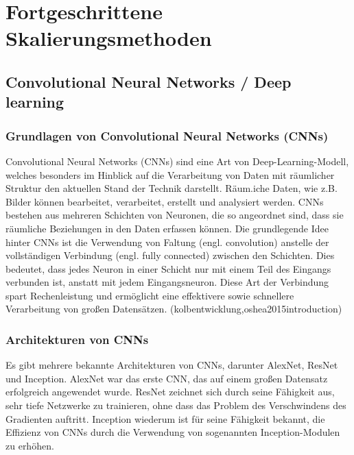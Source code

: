 


\chapter{Fortgeschrittene Skalierungsmethoden}
\section{Convolutional Neural Networks / Deep learning}
    \subsection{Grundlagen von Convolutional Neural Networks (CNNs)}
        Convolutional Neural Networks (CNNs) sind eine Art von Deep-Learning-Modell, welches besonders im Hinblick auf die Verarbeitung von Daten mit räumlicher Struktur den aktuellen Stand der Technik darstellt. 
        Räum.iche Daten, wie z.B. Bilder können bearbeitet, verarbeitet, erstellt und analysiert werden. 
        CNNs bestehen aus mehreren Schichten von Neuronen, die so angeordnet sind, dass sie räumliche Beziehungen in den Daten erfassen können.
        Die grundlegende Idee hinter CNNs ist die Verwendung von Faltung (engl. convolution) anstelle der vollständigen Verbindung (engl. fully connected) zwischen den Schichten. 
        Dies bedeutet, dass jedes Neuron in einer Schicht nur mit einem Teil des Eingangs verbunden ist, anstatt mit jedem Eingangsneuron. 
        Diese Art der Verbindung spart Rechenleistung und ermöglicht eine effektivere sowie schnellere Verarbeitung von großen Datensätzen.
        \footfullcite(kolbentwicklung,oshea2015introduction)
    \subsection{Architekturen von CNNs}
    
        Es gibt mehrere bekannte Architekturen von CNNs, darunter AlexNet, ResNet und Inception. 
        AlexNet war das erste CNN, das auf einem großen Datensatz erfolgreich angewendet wurde. 
        ResNet zeichnet sich durch seine Fähigkeit aus, sehr tiefe Netzwerke zu trainieren, ohne dass das Problem des Verschwindens des Gradienten auftritt. 
        Inception wiederum ist für seine Fähigkeit bekannt, die Effizienz von CNNs durch die Verwendung von sogenannten Inception-Modulen zu erhöhen.

